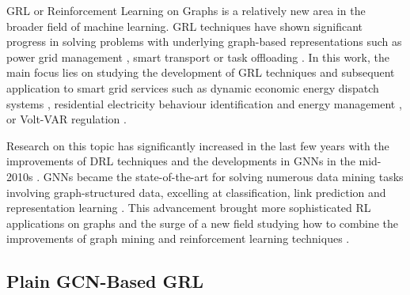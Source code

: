 \ac{GRL} or Reinforcement Learning on Graphs is a relatively new area in the broader field of machine learning. \ac{GRL} techniques have shown significant progress in solving problems with underlying graph-based representations such as power grid management \cite{liNovelGraphReinforcement2022, chenGraphRepresentationLearningbased2023}, smart transport \cite{xingBilevelGraphReinforcement2023, almasanDeepReinforcementLearning2022} or task offloading \cite{gaoFastAdaptiveTask2023, liGraphReinforcementLearningbased2022}. In this work, the main focus lies on studying the development of \ac{GRL} techniques and subsequent application to smart grid services such as dynamic economic energy dispatch systems \cite{chenScalableGraphReinforcement2023, xingRealtimeOptimalScheduling2023}, residential electricity behaviour identification and energy management \cite{chenGraphRepresentationLearningbased2023}, or Volt-VAR regulation \cite{huMultiagentGraphReinforcement2024}.  \par
Research on this topic has significantly increased in the last few years with the improvements of \ac{DRL} techniques and the developments in \acp{GNN} in the mid-2010s \cite{kipfSemiSupervisedClassificationGraph2017, velickovicGraphAttentionNetworks2018, liGatedGraphSequence2016, gaoGraphUNets2019}. \acp{GNN} became the state-of-the-art for solving numerous data mining tasks involving graph-structured data, excelling at classification, link prediction and representation learning \cite{xuHowPowerfulAre2019, nieReinforcementLearningGraphs2023}. This advancement brought more sophisticated \ac{RL} applications on graphs and the surge of a new field studying how to combine the improvements of graph mining and reinforcement learning techniques \cite{vesselinovaLearningCombinatorialOptimization2020, nieReinforcementLearningGraphs2023}. \par

\subsection{Plain GCN-Based GRL} \label{sec:review-gcn}

